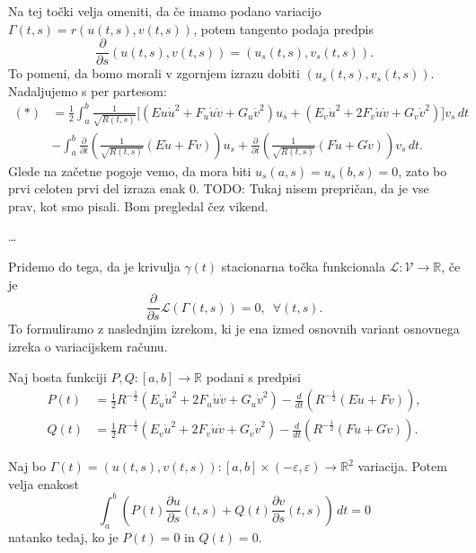 Na tej točki velja omeniti, da če imamo podano variacijo $\Gamma(t,s) = r(u(t,s), v(t,s))$, potem tangento podaja predpis \begin{equation*}
\frac{ \partial  }{ \partial s } (u(t,s), v(t,s)) = (u_s(t,s), v_s(t,s)).
\end{equation*}  
To pomeni, da bomo morali v zgornjem izrazu dobiti $(u_s(t,s), v_s(t,s))$. Nadaljujemo s per partesom: \begin{align*}
    (*) &= \frac{1}{2} \int_{a}^{b}  \frac{1}{\sqrt{R(t,s)}} \bigg[ (Eu \dot{u}^2 + F_u \dot{u} \dot{v} + G_u \dot{v}^2) u_s + (E_v \dot{u}^2 + 2F_v \dot{u} \dot{v} + G_v \dot{v}^2) \bigg]v_s \, dt \\
    &- \int_{a}^{b} \frac{ \partial  }{ \partial t } \left( \frac{1}{\sqrt{R(t,s)}} (E\dot{u} + F\dot{v}) \right) u_s  + \frac{ \partial  }{ \partial t } \left( \frac{1}{\sqrt{R(t,s)}} (F\dot{u} + G\dot{v}) \right) v_s \, dt.
\end{align*}
Glede na začetne pogoje vemo, da mora biti $u_s(a,s) = u_s(b,s) = 0$, zato bo prvi celoten prvi del izraza enak 0.
TODO: Tukaj nisem prepričan, da je vse prav, kot smo pisali. Bom pregledal čez vikend.

\ldots

Pridemo do tega, da je krivulja $\gamma(t)$ stacionarna točka funkcionala $\mathcal{L}: \mathcal{V} \to  \mathbb{R}$, če je \begin{equation*}
\frac{ \partial  }{ \partial s } \mathcal{L}(\Gamma(t,s)) = 0,\,\,\, \forall (t,s).  
\end{equation*}  
To formuliramo z naslednjim izrekom, ki je ena izmed osnovnih variant osnovnega izreka o variacijskem računu.

\begin{izrek}
\label{izr_osnovni_izrek_o_variacijskem_racunu}
Naj bosta funkciji $P, Q: [a,b] \to  \mathbb{R}$ podani s predpisi \begin{align*}
    P(t) &= \frac{1}{2} R^{-\frac{1}{2}} (E_u \dot{u}^2 + 2F_u \dot{u} \dot{v} + G_u \dot{v}^2) - \frac{d}{dt} (R^{-\frac{1}{2}}(E\dot{u} + F\dot{v})), \\
    Q(t) &= \frac{1}{2} R^{-\frac{1}{2}} (E_v \dot{u}^2 + 2F_v \dot{u} \dot{v} + G_v \dot{v}^2) - \frac{d}{dt} (R^{-\frac{1}{2}}(F\dot{u} + G\dot{v})).
\end{align*}

Naj bo $\Gamma(t) = (u(t,s), v(t,s)) : [a,b] \times (-\varepsilon, \varepsilon) \to \mathbb{R}^2$ variacija. Potem velja enakost \begin{equation*}
 \int_{a}^{b}  \left( P(t) \frac{ \partial u }{ \partial s }(t, s)  + Q(t) \frac{ \partial v }{ \partial s }(t, s) \right)  \, dt = 0 
 \end{equation*}  
natanko tedaj, ko je $P(t) = 0$ in $Q(t) = 0$.
\end{izrek}

